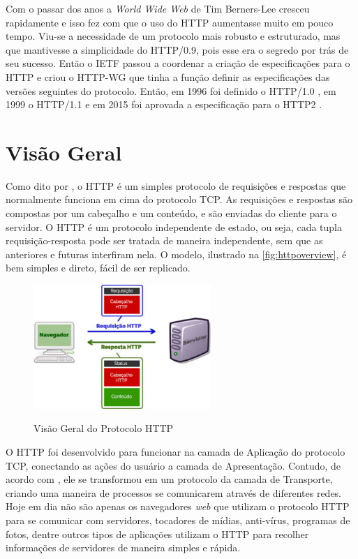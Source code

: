 Com o passar dos anos a \textit{World Wide Web} de Tim Berners-Lee cresceu rapidamente e isso fez com que o uso do HTTP aumentasse muito em pouco tempo. Viu-se a necessidade de um protocolo mais robusto e estruturado, mas que mantivesse a simplicidade do HTTP/0.9, pois esse era o segredo por trás de seu sucesso. Então o IETF  passou a coordenar a criação de especificações para o HTTP e criou o HTTP-WG que tinha a função definir as especificações das versões seguintes do protocolo. Então, em 1996 foi definido o HTTP/1.0 \cite{RFC1945}, em 1999 o HTTP/1.1 \cite{RFC2616} e em 2015 foi aprovada a especificação para o HTTP2 \cite{HTTP2Spec}.

\section{Visão Geral}
\label{sec:http_visão_geral}

Como dito por \cite{Tanenbaum}, o HTTP é um simples protocolo de requisições e respostas que normalmente funciona em cima do protocolo TCP. As requisições e respostas são compostas por um cabeçalho e um conteúdo, e são enviadas do cliente para o servidor. O HTTP é um protocolo independente de estado, ou seja, cada tupla requisição-resposta pode ser tratada de maneira independente, sem que as anteriores e futuras interfiram nela. O modelo, ilustrado na \autoref{fig:httpoverview}, é bem simples e direto, fácil de ser replicado.

\begin{figure}[!htb]
    \centering
    \caption{Visão Geral do Protocolo HTTP}
    \includegraphics[width=0.6\textwidth]{./04-figuras/fund-teorica/http_overview}
    \label{fig:httpoverview}
\end{figure}

O HTTP foi desenvolvido para funcionar na camada de Aplicação do protocolo TCP, conectando as ações do usuário a camada de Apresentação. Contudo, de acordo com \cite{Tanenbaum}, ele se transformou em um protocolo da camada de Transporte, criando uma maneira de processos se comunicarem através de diferentes redes. Hoje em dia não são apenas os navegadores \textit{web} que utilizam o protocolo HTTP para se comunicar com servidores, tocadores de mídias, anti-vírus, programas de fotos, dentre outros tipos de aplicações utilizam o HTTP para recolher informações de servidores de maneira simples e rápida.


